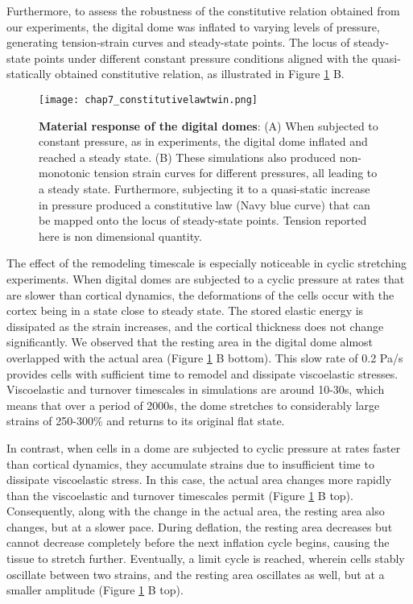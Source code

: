 Furthermore, to assess the robustness of the constitutive relation obtained from our experiments, the digital dome was inflated to varying levels of pressure, generating tension-strain curves and steady-state points. The locus of steady-state points under different constant pressure conditions aligned with the quasi-statically obtained constitutive relation, as illustrated in Figure  \ref{fig_7_7} B.


\begin{figure}[t]
	\centering
	\texttt{[image: chap7\_constitutivelawtwin.png]}
	\caption{\label{fig_7_7} \textbf{Material response of the digital domes}: (A) When subjected to constant pressure, as in experiments, the digital dome inflated and reached a steady state. (B) These simulations also produced non-monotonic tension strain curves for different pressures, all leading to a steady state. Furthermore, subjecting it to a quasi-static increase in pressure produced a constitutive law (Navy blue curve) that can be mapped onto the locus of steady-state points. Tension reported here is non dimensional quantity.}
\end{figure}

The effect of the remodeling timescale is especially noticeable in cyclic stretching experiments. When digital domes are subjected to a cyclic pressure at rates that are slower than cortical dynamics, the deformations of the cells occur with the cortex being in a state close to steady state. The stored elastic energy is dissipated as the strain increases, and the cortical thickness does not change significantly. We observed that the resting area in the digital dome almost overlapped with the actual area (Figure \ref{fig_7_7} B bottom). This slow rate of 0.2 Pa/s provides cells with sufficient time to remodel and dissipate viscoelastic stresses. Viscoelastic and turnover timescales in simulations are around 10-30s, which means that over a period of 2000s, the dome stretches to considerably large strains of 250-300\% and returns to its original flat state.

In contrast, when cells in a dome are subjected to cyclic pressure at rates faster than cortical dynamics, they accumulate strains due to insufficient time to dissipate viscoelastic stress. In this case, the actual area changes more rapidly than the viscoelastic and turnover timescales permit (Figure \ref{fig_7_7} B top). Consequently, along with the change in the actual area, the resting area also changes, but at a slower pace. During deflation, the resting area decreases but cannot decrease completely before the next inflation cycle begins, causing the tissue to stretch further. Eventually, a limit cycle is reached, wherein cells stably oscillate between two strains, and the resting area oscillates as well, but at a smaller amplitude (Figure \ref{fig_7_7} B top).


